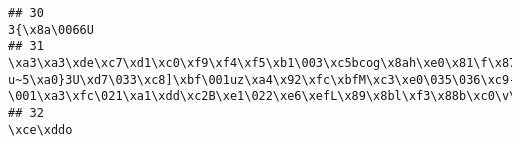 \documentclass[
]{article}
\begin{document}
\begin{verbatim}
## 30                                                                                                                                                                                                                                                                                                                                                                                                                                                                                                                                                                                                                                                                                                                                                                                                                                                                                               3{\x8a\0066U
## 31                                                                                                                                                                                                                                                                                                                                                                                                                                                                                                                                 \xa3\xa3\xde\xc7\xd1\xc0\xf9\xf4\xf5\xb1\003\xc5bcog\x8ah\xe0\x81\f\x87v\xbdj~p\xb6R\x96x\xf2\x89UQ\033\x98D\xd2^kv\023\006\xcb\025%\x8ce2P\016VJ\x99G\x9d\xac\xbb\xda\021\xf5\xb6\xae?u~5\xa0}3U\xd7\033\xc8]\xbf\001uz\xa4\x92\xfc\xbfM\xc3\xe0\035\036\xc9-\001\xa3\xfc\021\xa1\xdd\xc2B\xe1\022\xe6\xefL\x89\x8bl\xf3\x88b\xc0\v\x86gk[\x95{A\xb7\x8d~\xfb\xaf\xfd\005
## 32                                                                                                                                                                                                                                                                                                                                                                                                                                                                                                                                                                                                                                                                                                                                                                                                                                                                                                  \xce\xddo

\end{verbatim}
\end{document}
